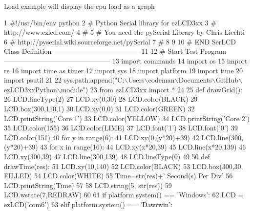 Load example will display the cpu load as a graph  
\begin{DoxyCodeInclude}
1 \textcolor{comment}{#!/usr/bin/env python}
2 \textcolor{comment}{# Python Serial library for ezLCD3xx}
3 \textcolor{comment}{# http://www.ezlcd.com/}
4 \textcolor{comment}{#}
5 \textcolor{comment}{# You need the pySerial Library by Chris Liechti}
6 \textcolor{comment}{# http://pyserial.wiki.sourceforge.net/pySerial}
7 \textcolor{comment}{#}
8 
9 
10 \textcolor{comment}{# END SerLCD Class Definition --------------------------------------}
11 
12 \textcolor{comment}{# Start Test Program -----------------------------------------------}
13 \textcolor{keyword}{import} commands
14 \textcolor{keyword}{import} os
15 \textcolor{keyword}{import} re
16 \textcolor{keyword}{import} time \textcolor{keyword}{as} timer
17 \textcolor{keyword}{import} sys
18 \textcolor{keyword}{import} platform
19 \textcolor{keyword}{import} time
20 \textcolor{keyword}{import} psutil
21     
22 sys.path.append(\textcolor{stringliteral}{"C:\(\backslash\)Users\(\backslash\)codeman\(\backslash\)Documents\(\backslash\)GitHub\(\backslash\)ezLCD3xxPython\(\backslash\)module"}) 
23 \textcolor{keyword}{from} ezLCD3xx \textcolor{keyword}{import} *
24 
25 \textcolor{keyword}{def }drawGrid():
26     LCD.lineType(2)
27     LCD.xy(0,30)
28     LCD.color(BLACK)
29     LCD.box(300,110,1)
30     LCD.xy(0,0)
31     LCD.color(GREEN)
32     LCD.printString(\textcolor{stringliteral}{'Core 1'})
33     LCD.color(YELLOW)
34     LCD.printString(\textcolor{stringliteral}{'Core 2'})
35     LCD.color(155)
36     LCD.color(LIME)
37     LCD.font(\textcolor{stringliteral}{'1'})
38     LCD.font(\textcolor{stringliteral}{'0'})
39     LCD.color(151)
40     \textcolor{keywordflow}{for} y \textcolor{keywordflow}{in} range(6):
41         LCD.xy(0,(y*20)+39)
42         LCD.line(300,(y*20)+39)
43     \textcolor{keywordflow}{for} x \textcolor{keywordflow}{in} range(16):
44         LCD.xy(x*20,39)
45         LCD.line(x*20,139)
46     LCD.xy(300,39)
47     LCD.line(300,139)
48     LCD.lineType(0)
49     
50 \textcolor{keyword}{def }drawTime(res):
51     LCD.xy(10,140)
52     LCD.color(BLACK)
53     LCD.box(300,30, FILLED)
54     LCD.color(WHITE)
55     Time=str(res)+\textcolor{stringliteral}{' Second(s) Per Div'}
56     LCD.printString(Time)
57 
58     LCD.string(5, str(res))
59     LCD.wstate(7,REDRAW)
60             
61 \textcolor{keywordflow}{if} platform.system() == \textcolor{stringliteral}{'Windows'}:
62     LCD = ezLCD(\textcolor{stringliteral}{'com6'}) 
63 \textcolor{keywordflow}{elif} platform.system() == \textcolor{stringliteral}{'Dawrwin'}:

\end{DoxyCodeInclude}
